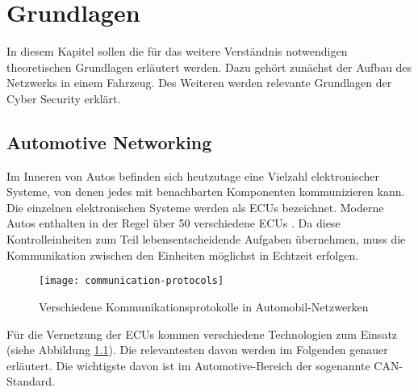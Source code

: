 \chapter{Grundlagen}
In diesem Kapitel sollen die für das weitere Verständnis notwendigen theoretischen Grundlagen erläutert werden. Dazu gehört zunächst der Aufbau des Netzwerks in einem Fahrzeug. Des Weiteren werden relevante Grundlagen der Cyber Security erklärt.

\section{Automotive Networking}
Im Inneren von Autos befinden sich heutzutage eine Vielzahl elektronischer Systeme, von denen jedes mit benachbarten Komponenten kommunizieren kann. Die einzelnen elektronischen Systeme werden als \acp{ECU} bezeichnet. Moderne Autos enthalten in der Regel über 50 verschiedene \acsp{ECU} \cite[vgl.][6]{Miller.2013}. Da diese Kontrolleinheiten zum Teil lebensentscheidende Aufgaben übernehmen, muss die Kommunikation zwischen den Einheiten möglichst in Echtzeit erfolgen. \\

\begin{figure}[H]
\centering
\texttt{[image: communication-protocols]}
\label{fig:communication-protocols}
\caption{Verschiedene Kommunikationsprotokolle in Automobil-Netzwerken}
\end{figure}

Für die Vernetzung der \acsp{ECU} kommen verschiedene Technologien zum Einsatz (siehe Abbildung \ref{fig:communication-protocols}). Die relevantesten davon werden im Folgenden genauer erläutert. Die wichtigste  davon ist im Automotive-Bereich der sogenannte \acs{CAN}-Standard.

